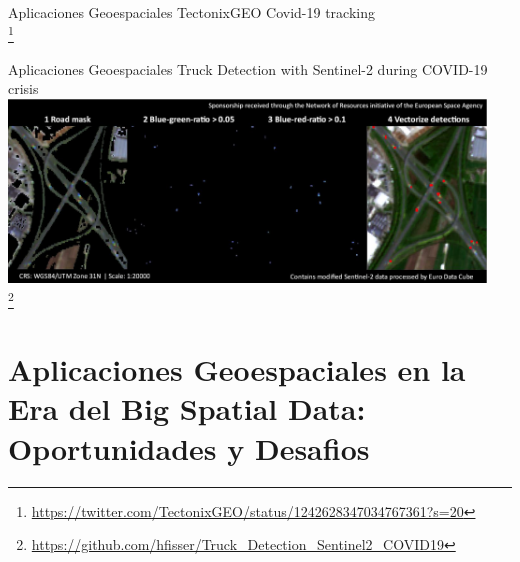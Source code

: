 \documentclass{beamer}
\newcommand\blfootnote[1]{%
  \begingroup
  \renewcommand\thefootnote{}\footnote{#1}%
  \addtocounter{footnote}{-1}%
  \endgroup
}
\begin{document}
\begin{frame}{Aplicaciones Geoespaciales}
    TectonixGEO Covid-19 tracking
    \centering
    \\
    \blfootnote{\url{https://twitter.com/TectonixGEO/status/1242628347034767361?s=20}}
\end{frame}

\begin{frame}{Aplicaciones Geoespaciales}
    Truck Detection with Sentinel-2 during COVID-19 crisis
    \centering
    \includegraphics[width=0.95\textwidth]{figures/trucks}\\
    \blfootnote{\url{https://github.com/hfisser/Truck_Detection_Sentinel2_COVID19}}
\end{frame}

\section[Oportunidades y Desafios]{Aplicaciones Geoespaciales en la Era del Big Spatial Data: Oportunidades y Desafios}
\end{document}
